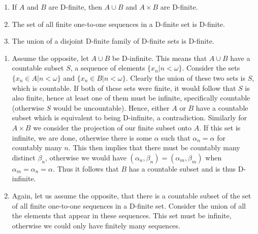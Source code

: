 \setcounter{problem}{14}
\begin{problem}
  \begin{enumerate}[label=(\roman*)]
    \item If $A$ and $B$ are D-finite, then $A \cup B$ and $A \times B$ are D-finite.
    \item The set of all finite one-to-one sequences in a D-finite set is D-finite.
    \item The union of a disjoint D-finite family of D-finite sets is D-finite.
  \end{enumerate}
\end{problem}

\begin{solution}
  \begin{enumerate}[label=(\roman*)]
    \item Assume the opposite, let $A \cup B$ be D-infinite.
      This means that $A \cup B$ have a countable subset $S$, a sequence of elements $\{x_n | n < \omega\}$.
      Consider the sets $\{x_n \in A | n < \omega\}$ and $\{x_n \in B | n < \omega\}$.
      Clearly the union of these two sets is $S$, which is countable.
      If both of these sets were finite, it would follow that $S$ is also finite, hence at least one of them must be infinite, specifically countable (otherwise $S$ would be uncountable).
      Hence, either $A$ or $B$ have a countable subset which is equivalent to being D-infinite, a contradiction.
      Similarly for $A \times B$ we consider the projection of our finite subset onto $A$.
      If this set is infinite, we are done, otherwise there is some $\alpha$ such that $\alpha_n = \alpha$ for countably many $n$.
      This then implies that there must be countably many distinct $\beta_n$, otherwise we would have $(\alpha_n, \beta_n) = (\alpha_m, \beta_m)$ when $\alpha_m = \alpha_n = \alpha$.
      Thus it follows that $B$ has a countable subset and is thus D-infinite.
    \item Again, let us assume the opposite, that there is a countable subset of the set of all finite one-to-one sequences in a D-finite set.
      Consider the union of all the elements that appear in these sequences.
      This set must be infinite, otherwise we could only have finitely many sequences.
  \end{enumerate}
\end{solution}
